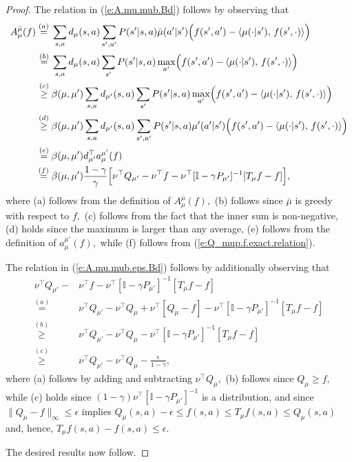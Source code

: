 \documentclass[twoside]{article}
\theoremstyle{plain}
\theoremstyle{definition}
\theoremstyle{remark}
\newcommand{\tr}{\top}
\newcommand{\bI}{\mathbb{I}}
\newcommand{\ap}{a'}
\newcommand{\stp}{s'}
\newcommand{\mup}{\mu'}
\newcommand{\mub}{\bar{\mu}}
\renewcommand{\eqref}[1]{(\ref{#1})}
\begin{document}
\begin{proof}
    The relation in \eqref{e:A.mu.mub.Bd} follows by observing that 
    \begin{align*}
        A_{\mu}^{\mub}(f) \overset{(a)}{=} {} & \sum_{s, a} d_{\mu}(s, a)  \sum_{s', \ap} P(\stp|s,a)  \mub(a'|s') \Bigl(    f(s',a') - \langle \mu(\cdot|s'),\, f(s',\cdot)\rangle \Bigr) \\
        \overset{(b)}{=} {} & \sum_{s, a} d_{\mu}(s, a)  \sum_{s'} P(\stp|s,a)  \max_{\ap} \Bigl(
        f(s',a') - \langle \mu(\cdot|s'),\, f(s',\cdot)\rangle \Bigr) \\
        \overset{(c)}{\geq} {} & \beta(\mu, \mup) \sum_{s, a} d_{\mup}(s, a)  \sum_{s'} P(\stp|s,a)  \max_{\ap} \Bigl(
        f(s',a') - \langle \mu(\cdot|s'),\, f(s',\cdot)\rangle \Bigr) \\
        \overset{(d)}{\geq} {} & \beta(\mu, \mup) \sum_{s, a} d_{\mup}(s, a)  \sum_{s', \ap} P(\stp|s,a) \mup(\ap|s')   \Bigl(
        f(s',a') - \langle \mu(\cdot|s'),\, f(s',\cdot)\rangle \Bigr) \\
        \overset{(e)}{=} {} & \beta(\mu, \mup) d_{\mup}^\tr a_{\mu}^{\mup}(f) \\
        \overset{(f)}{=} {} & \beta(\mu, \mup) \frac{1 - \gamma}{\gamma} \Big[ \nu^\tr Q_{\mup} - \nu^\tr f - \nu^\tr [\bI - \gamma P_{\mup}]^{-1}[T_{\mu}f - f] \Big],
    \end{align*}
where (a) follows from the definition of $A_{\mu}^{\mub}(f),$ (b) follows since $\mub$ is greedy with respect to $f,$ (c) follows from the fact that the inner sum is non-negative, (d) holds since the maximum is larger than any average, (e) follows from the definition of $a_{\mu}^{\mup}(f),$ while (f) follows from \eqref{e:Q_mup.f.exact.relation}.

The relation in \eqref{e:A.mu.mub.eps.Bd} follows by additionally observing that 
%
\begin{align*}
    \nu^\tr Q_{\mup} - & {} \nu^\tr f  - \nu^\tr [\bI - \gamma P_{\mup}]^{-1}[T_{\mu}f - f] \\
    \overset{(a)}{=} {} & \nu^\tr Q_{\mup} - \nu^\tr Q_{\mu} + \nu^\tr[Q_{\mu} - f]  - \nu^\tr [\bI - \gamma P_{\mup}]^{-1}[T_{\mu}f - f] \\
   \overset{(b)}{\geq} {} & \nu^\tr Q_{\mup} - \nu^\tr Q_{\mu} - \nu^\tr [\bI - \gamma P_{\mup}]^{-1}[T_{\mu}f - f] \\
   \overset{(c)}{\geq} {} & \nu^\tr Q_{\mup} - \nu^\tr Q_{\mu}  - \frac{\epsilon}{1 - \gamma},
\end{align*}
%
where (a) follows by adding and subtracting $\nu^\tr Q_{\mu},$ (b) follows since $Q_{\mu} \geq f,$ while (c) holds since $(1 - \gamma) \nu^\tr [\bI - \gamma P_{\mup}]^{-1}$ is a distribution, and  since $\|Q_{\mu} - f\|_\infty \leq \epsilon$ implies $Q_{\mu}(s, a) - \epsilon \leq f(s, a) \leq T_{\mu} f(s, a) \leq Q_{\mu}(s, a)$ and, hence, $T_{\mu} f(s, a) -f(s, a) \leq \epsilon.$

The desired results now follow.   %
\end{proof}
\end{document}
